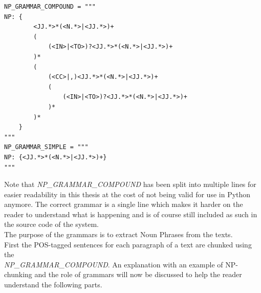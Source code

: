 \begin{lstlisting}[frame=single, caption={Noun Phrase grammars}, label=npgrammar]
NP_GRAMMAR_COMPOUND = """
NP: {
        <JJ.*>*(<N.*>|<JJ.*>)+
        (
            (<IN>|<TO>)?<JJ.*>*(<N.*>|<JJ.*>)+
        )*
        (
            (<CC>|,)<JJ.*>*(<N.*>|<JJ.*>)+
            (
                (<IN>|<TO>)?<JJ.*>*(<N.*>|<JJ.*>)+
            )*
        )*
    }
"""
NP_GRAMMAR_SIMPLE = """
NP: {<JJ.*>*(<N.*>|<JJ.*>)+}
"""
\end{lstlisting}
Note that \textit{NP\_GRAMMAR\_COMPOUND} has been split into multiple lines for easier readability in this thesis at the cost of not being valid for use in Python anymore. The correct grammar is a single line which makes it harder on the reader to understand what is happening and is of course still included as such in the source code of the system.\\
The purpose of the grammars is to extract Noun Phrases from the texts.\\
First the POS-tagged sentences for each paragraph of a text are chunked using the \\
\textit{NP\_GRAMMAR\_COMPOUND}. An explanation with an example of NP-chunking and the role of grammars will now be discussed to help the reader understand the following parts.
